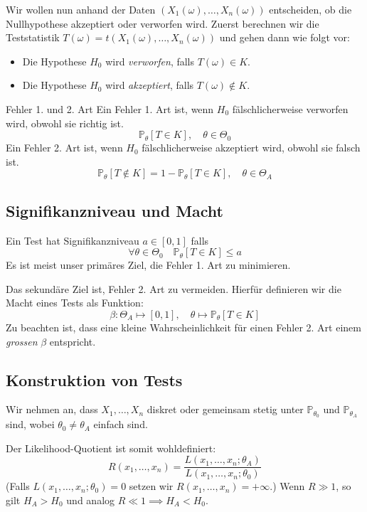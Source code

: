 \documentclass[a4paper,10pt]{article}
\def\P{\mathbb{P}}
\begin{document}
Wir wollen nun anhand der Daten \((X_1(\omega), \ldots, X_n(\omega))\) entscheiden, ob die Nullhypothese akzeptiert oder verworfen wird. Zuerst berechnen wir die Teststatistik \(T(\omega) = t(X_1(\omega), \ldots, X_n(\omega))\) und gehen dann wie folgt vor:
\begin{itemize}
	\item Die Hypothese \(H_0\) wird \textit{verworfen}, falls \(T(\omega) \in K\).
	\item Die Hypothese \(H_0\) wird \textit{akzeptiert}, falls \(T(\omega) \notin K\).
\end{itemize}
\begin{subbox}{Fehler 1. und 2. Art}
	Ein Fehler 1. Art ist, wenn \(H_0\) fälschlicherweise verworfen wird, obwohl sie richtig ist.
	\[\P_\theta[T \in K], \quad \theta \in \Theta_0\]
	\noindent Ein Fehler 2. Art ist, wenn \(H_0\) fälschlicherweise akzeptiert wird, obwohl sie falsch ist.
	\[\P_\theta[T\notin K] = 1 - \P_\theta[T \in K], \quad \theta \in \Theta_A\]
\end{subbox}
\subsection{Signifikanzniveau und Macht}
Ein Test hat Signifikanzniveau \(a \in [0,1]\) falls
\[\forall \theta \in \Theta_0 \quad \P_\theta[T \in K] \le a\]
Es ist meist unser primäres Ziel, die Fehler 1. Art zu minimieren.

Das sekundäre Ziel ist, Fehler 2. Art zu vermeiden. Hierfür definieren wir die Macht eines Tests als Funktion:
\[\beta : \Theta_A \mapsto [0,1], \quad \theta \mapsto \P_\theta[T \in K]\]
Zu beachten ist, dass eine kleine Wahrscheinlichkeit für einen Fehler 2. Art einem \textit{grossen} \(\beta\) entspricht.

\subsection{Konstruktion von Tests}
Wir nehmen an, dass \(X_1, \ldots, X_n\) diskret oder gemeinsam stetig unter \(\P_{\theta_0}\) und \(\P_{\theta_A}\) sind, wobei \(\theta_0 \ne \theta_A\) einfach sind.

\noindent Der Likelihood-Quotient ist somit wohldefiniert:
\[R(x_1, \ldots, x_n) = \frac{L(x_1,\ldots, x_n;\theta_A)}{L(x_1, \ldots, x_n;\theta_0)}\]
(Falls \(L(x_1, \ldots, x_n; \theta_0) = 0\) setzen wir \(R(x_1, \ldots, x_n) = +\infty\).) Wenn \(R \gg 1\), so gilt \(H_A > H_0\) und analog \(R \ll 1 \implies H_A < H_0\).
\end{document}
